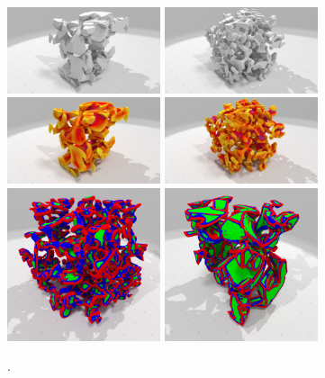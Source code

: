 \begin{figure}[ht]{
    \begin{center}
    \includegraphics[trim={17cm 0 13cm 0},clip,width=4.5cm]{images/digitalSnow/SnowE2_DigitalData}
    \includegraphics[trim={17cm 0 13cm 0},clip,width=4.5cm]{images/digitalSnow/SnowI08_DigitalData}\\
    \includegraphics[trim={17cm 0 13cm 0},clip,width=4.5cm]{images/digitalSnow/snowE2mean_0001}
    \includegraphics[trim={17cm 0 13cm 0},clip,width=4.5cm]{images/digitalSnow/snowI08mean_0001}\\
    \includegraphics[width=4.5cm]{images/digitalSnow/Snow_I08_II_scale}
    \includegraphics[width=4.5cm]{images/digitalSnow/Snow_E2bis_II_scale}\\
    \end{center}}
    \caption{.
      \label{fig:digitalSnow-curv}}
\end{figure}

